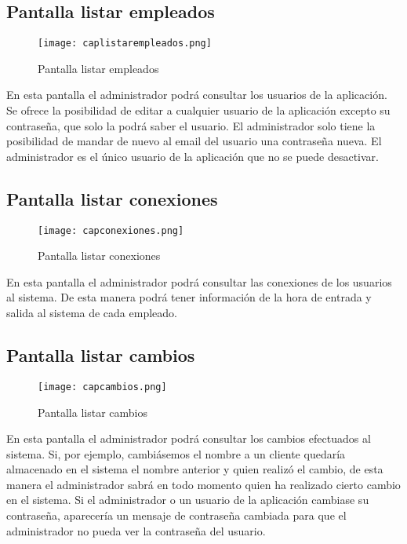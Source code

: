\newpage
\subsection {Pantalla listar empleados}

\begin{figure}[!htb]
  \centering
    \texttt{[image: caplistarempleados.png]}
  \caption{Pantalla listar empleados}
  \label{a}
\end{figure}

En esta pantalla el administrador podrá consultar los usuarios de la aplicación. Se ofrece la posibilidad de editar a cualquier usuario de la aplicación excepto su contraseña, que solo la podrá saber el usuario. El administrador solo tiene la posibilidad de mandar de nuevo al email del usuario una contraseña nueva. El administrador es el único usuario de la aplicación que no se puede desactivar.

\subsection {Pantalla listar conexiones}

\begin{figure}[!htb]
  \centering
    \texttt{[image: capconexiones.png]}
  \caption{Pantalla listar conexiones}
  \label{a}
\end{figure}

En esta pantalla el administrador podrá consultar las conexiones de los usuarios al sistema. De esta manera podrá tener información de la hora de entrada y salida al sistema de cada empleado.

\newpage
\subsection {Pantalla listar cambios}

\begin{figure}[!htb]
  \centering
    \texttt{[image: capcambios.png]}
  \caption{Pantalla listar cambios}
  \label{a}
\end{figure}

En esta pantalla el administrador podrá consultar los cambios efectuados al sistema. Si, por ejemplo, cambiásemos el nombre a un cliente quedaría almacenado en el sistema el nombre anterior y quien realizó el cambio, de esta manera el administrador sabrá en todo momento quien ha realizado cierto cambio en el sistema. Si el administrador o un usuario de la aplicación cambiase su contraseña, aparecería un mensaje de contraseña cambiada para que el administrador no pueda ver la contraseña del usuario.

